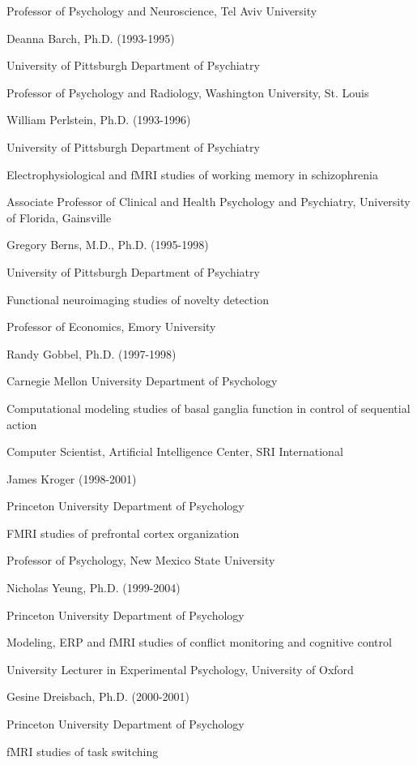 \documentclass[10 pt]{article}
\begin{document}
Professor of Psychology and Neuroscience, Tel Aviv University
    \medskip

Deanna Barch, Ph.D. (1993-1995)

University of Pittsburgh Department of Psychiatry

Professor of Psychology and Radiology, Washington University, St. Louis
    \medskip

William Perlstein, Ph.D. (1993-1996)

University of Pittsburgh Department of Psychiatry

Electrophysiological and fMRI studies of working memory in schizophrenia

Associate Professor of Clinical and Health Psychology and Psychiatry, University of Florida, Gainsville
    \medskip

Gregory Berns, M.D., Ph.D. (1995-1998)

University of Pittsburgh Department of Psychiatry

Functional neuroimaging studies of novelty detection

Professor of Economics, Emory University
    \medskip

Randy Gobbel, Ph.D. (1997-1998)

Carnegie Mellon University Department of Psychology

Computational modeling studies of basal ganglia function in control of sequential action

Computer Scientist, Artificial Intelligence Center, SRI International
    \medskip

James Kroger (1998-2001)

Princeton University Department of Psychology

FMRI studies of prefrontal cortex organization

Professor of Psychology, New Mexico State University
    \medskip

Nicholas Yeung, Ph.D. (1999-2004)

Princeton University Department of Psychology

Modeling, ERP and fMRI studies of conflict monitoring and cognitive control

University Lecturer in Experimental Psychology, University of Oxford
    \medskip

Gesine Dreisbach, Ph.D. (2000-2001)

Princeton University Department of Psychology

fMRI studies of task switching
\end{document}
